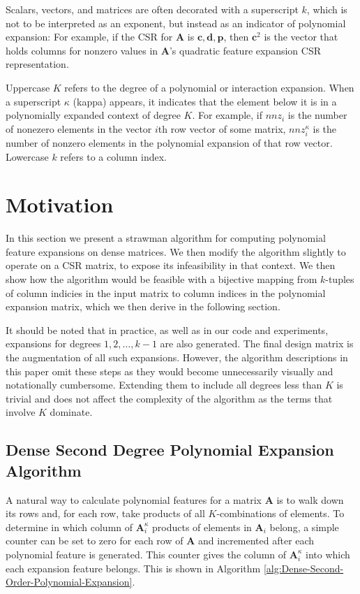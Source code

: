 \documentclass[journal]{journal}
\begin{document}
Scalars, vectors, and matrices are often decorated with a superscript $k$, which is not to be interpreted as an exponent, but instead as an indicator of polynomial expansion: 
For example, if the CSR for $\bm{A}$ is $\bm{c}, \bm{d}, \bm{p}$, then $\bm{c}^2$ is the vector that holds columns for nonzero values in $\bm{A}$'s quadratic feature expansion CSR representation.

Uppercase $K$ refers to the degree of a polynomial or interaction expansion.
When a superscript $\kappa$ (kappa) appears, it indicates that the element below it is in a polynomially expanded context of degree $K$.
For example, if $nnz_i$ is the number of nonezero elements in the vector $i$th row vector of some matrix, $nnz_i^\kappa$ is the number of nonzero elements in the polynomial expansion of that row vector.
Lowercase $k$ refers to a column index.

\section{Motivation}
In this section we present a strawman algorithm for computing polynomial feature expansions on dense matrices.
We then modify the algorithm  slightly to operate on a CSR matrix, to expose its infeasibility in that context.
We then show how the algorithm would be feasible with a bijective mapping from $k$-tuples of column indicies in the input matrix to column indices in the polynomial expansion matrix, which we then derive in the following section.

It should be noted that in practice, as well as in our code and experiments, expansions for degrees $1, 2, \dots, k-1$ are also generated.
The final design matrix is the augmentation of all such expansions.
However, the algorithm descriptions in this paper omit these steps as they would become unnecessarily visually and notationally cumbersome.
Extending them to include all degrees less than $K$ is trivial and does not affect the complexity of the algorithm as the terms that involve $K$ dominate.

\subsection{Dense Second Degree Polynomial Expansion Algorithm}
A natural way to calculate polynomial features for a matrix $\bm{A}$ is to walk down its rows and, for each row, take products of all $K$-combinations of elements.
To determine in which column of $\bm{A}^\kappa_i$ products of elements in $\bm{A}_i$ belong, a simple counter can be set to zero for each row of $\bm{A}$ and incremented after each polynomial feature is generated.
This counter gives the column of $\bm{A}^\kappa_i$ into which each expansion feature belongs.
This is shown in Algorithm \ref{alg:Dense-Second-Order-Polynomial-Expansion}.
\end{document}
